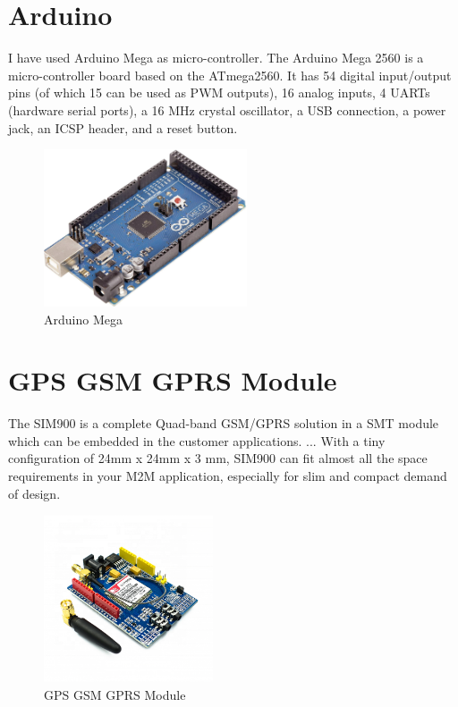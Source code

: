 \section{Arduino}
I have used Arduino Mega as micro-controller. The Arduino Mega 2560 is a micro-controller board based on the ATmega2560. It has 54 digital input/output pins (of which 15 can be used as PWM outputs), 16 analog inputs, 4 UARTs (hardware serial ports), a 16 MHz crystal oscillator, a USB connection, a power jack, an ICSP header, and a reset button.\cite{barrett2013arduino}
\begin{figure} [h!]
\centering
 \includegraphics[width=6cm]{Results/arduino.jpg}
 \caption[]{Arduino Mega}
    \label{}
\end{figure}
\section{GPS GSM GPRS Module}
The SIM900 is a complete Quad-band GSM/GPRS solution in a SMT module which can be embedded in the customer applications. ... With a tiny configuration of 24mm x 24mm x 3 mm, SIM900 can fit almost all the space requirements in your M2M application, especially for slim and compact demand of design.\cite{leekongxuesmart}
\begin{figure} [h!]
\centering
 \includegraphics[width=5cm]{Results/900.png}
 \caption[]{GPS GSM GPRS Module}
    \label{}
\end{figure}